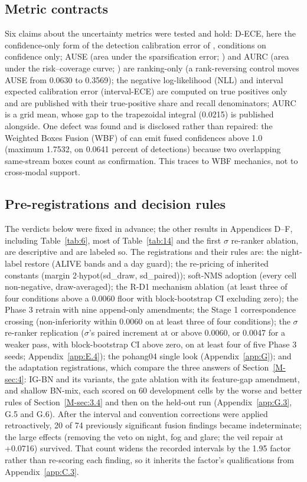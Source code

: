 \documentclass[journal,onecolumn]{IEEEtran}
\begin{document}
\subsection{Metric contracts}\label{app:C.5}
Six claims about the uncertainty metrics were tested and hold: D-ECE, here the confidence-only form of the detection calibration error of \citet{kuppers2020multivariate}, conditions on confidence only; AUSE (area under the sparsification error; \cite{ilg2018uncertainty}) and AURC (area under the risk--coverage curve; \cite{geifman2019biasreduced}) are ranking-only (a rank-reversing control moves AUSE from 0.0630 to 0.3569); the negative log-likelihood (NLL) and interval expected calibration error (interval-ECE) are computed on true positives only and are published with their true-positive share and recall denominators; AURC is a grid mean, whose gap to the trapezoidal integral (0.0215) is published alongside. One defect was found and is disclosed rather than repaired: the Weighted Boxes Fusion (WBF) of \citet{solovyev2021weighted} can emit fused confidences above 1.0 (maximum 1.7532, on 0.0641 percent of detections) because two overlapping same-stream boxes count as confirmation. This traces to WBF mechanics, not to cross-modal support.

\subsection{Pre-registrations and decision rules}\label{app:C.6}
The verdicts below were fixed in advance; the other results in Appendices D--F, including Table~\ref{tab:6}, most of Table~\ref{tab:14} and the first $\sigma$ re-ranker ablation, are descriptive and are labeled so. The registrations and their rules are: the night-label restore (ALIVE bands and a day guard); the re-pricing of inherited constants (margin 2$\cdot$hypot(sd\_draw, sd\_paired)); soft-NMS \cite{bodla2017softnms} adoption (every cell non-negative, draw-averaged); the R-D1 mechanism ablation (at least three of four conditions above a 0.0060 floor with block-bootstrap CI excluding zero); the Phase 3 retrain with nine append-only amendments; the Stage 1 correspondence crossing (non-inferiority within 0.0060 on at least three of four conditions); the $\sigma$ re-ranker replication ($\sigma$'s paired increment at or above 0.0060, or 0.0047 for a weaker pass, with block-bootstrap CI above zero, on at least four of five Phase 3 seeds; Appendix~\ref{app:E.4}); the pohang04 single look (Appendix~\ref{app:G}); and the adaptation registrations, which compare the three answers of Section~\ref{M-sec:4}: \mbox{IG-BN} and its variants, the gate ablation with its feature-gap amendment, and shallow BN-mix, each scored on 60 development cells by the worse and better rules of Section~\ref{M-sec:3.4} and then on the held-out run (Appendix~\ref{app:G.3}, G.5 and G.6). After the interval and convention corrections were applied retroactively, 20 of 74 previously significant fusion findings became indeterminate; the large effects (removing the veto on night, fog and glare; the veil repair at +0.0716) survived. That count widens the recorded intervals by the 1.95 factor rather than re-scoring each finding, so it inherits the factor's qualifications from Appendix~\ref{app:C.3}.
\end{document}
